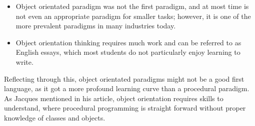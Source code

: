\begin{itemize}
    \item Object orientated paradigm was not the first paradigm, and at most time is not even an appropriate paradigm for smaller tasks; however, it is one of the more prevalent paradigms in many industries today.   
    \item Object orientation thinking requires much work and can be referred to as English essays, which most students do not particularly enjoy learning to write.\cite{tutlisp}\cite{medlisp}
\end{itemize}
Reflecting through this, object orientated paradigms might not be a good first language, as it got a more profound learning curve than a procedural paradigm. As Jacques mentioned in his article, object orientation requires skills to understand, where procedural programming is straight forward without proper knowledge of classes and objects.\\
\\
